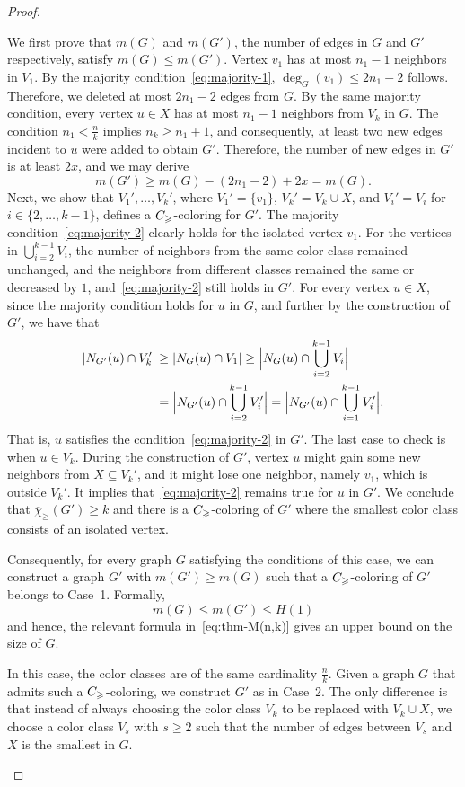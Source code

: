 \documentclass[10pt,a4paper]{amsart}
\newcommand{\cg}{{\rm C}_{\geqslant}}
\newcommand{\mc}{\overline{\chi}_{\geqslant}}
\begin{document}
\begin{proof}
\begin{description}
       We first prove that $m(G)$ and $m(G')$, the number of edges in $G$ and $G'$ respectively, satisfy $m(G) \leq m(G')$. Vertex $v_1 $ has at most $n_1-1$ neighbors in $V_1$. By the majority condition~\eqref{eq:majority-1}, $\deg_G(v_1) \leq 2n_1-2$ follows. Therefore, we deleted at most $2n_1-2$ edges from $G$. By the same majority condition, every vertex $u \in X$ has at most $n_1-1$ neighbors from $V_k$ in $G$. The condition $n_1 < \frac{n}{k}$ implies $n_k \ge n_1+1$, and consequently, at least two new edges incident to $u$ were added to obtain $G'$. Therefore, the number of new edges in $G'$ is at least $2x$, and we may derive 
       $$m(G') \ge m(G) -(2n_1-2) + 2x = m(G). 
       $$
       Next, we show that $V_1', \dots, V_k'$, where $V_1'=\{v_1\}$, $V_k'=V_k \cup X$, and $V_i'=V_i$ for $i\in \{2, \dots, k-1\}$, defines a $\cg$-coloring for $G'$. The majority condition~\eqref{eq:majority-2} clearly holds for the isolated vertex $v_1$. For the vertices in $\bigcup_{i=2}^{k-1} V_i$, the number of neighbors from the same color class remained unchanged, and the neighbors from different classes remained the same or decreased by $1$, and~\eqref{eq:majority-2} still holds in $G'$. For every vertex $u \in X$, since the majority condition holds for $u$ in $G$, and further by the construction of $G'$, we have that
       \begin{align*}
           |N_{G'}(u) \cap V_k'| &\ge |N_{G}(u) \cap V_1 | \ge \Bigl|N_{G}(u) \cap \bigcup_{i=2}^{k-1} V_i \Bigr|\\
           &= \Bigl|N_{G'}(u) \cap \bigcup_{i=2}^{k-1} V_i' \Bigr|
       = \Bigl|N_{G'}(u) \cap \bigcup_{i=1}^{k-1} V_i' \Bigr|.
       \end{align*}
       That is, $u$ satisfies the condition~\eqref{eq:majority-2} in $G'$. The last case to check is when $u \in V_k$. During the construction of $G'$, vertex $u$ might gain some new neighbors from $X \subseteq V_k'$, and it might lose one neighbor, namely $v_1$, which is outside $V_k'$. It implies that~\eqref{eq:majority-2} remains true for $u$ in $G'$. We conclude that $\mc(G') \ge k$ and there is a $\cg$-coloring of $G'$ where the smallest color class consists of an isolated vertex.

       Consequently, for every graph $G$ satisfying the conditions of this case, we can construct a graph $G'$ with $m(G') \ge m(G)$ such that a $\cg$-coloring of $G'$ belongs to Case~1. Formally,
       $$m(G) \leq m(G') \leq H(1)$$
       and hence, the relevant formula in~\eqref{eq:thm-M(n,k)} gives an upper bound on the size of $G$.
       \item[Case 3. $n_1=\frac{n}{k}$]
       In this case, the color classes are of the same cardinality $\frac{n}{k}$. Given a graph $G$ that admits such a $\cg$-coloring, we construct $G'$ as in Case~2. The only difference is that instead of always choosing the color class $V_k$ to be replaced with $V_k \cup X$, we choose a color class $V_s$ with $s \ge 2$ such that the number of edges between $V_s$ and $X$ is the smallest in $G$. 
       

\end{description}
\end{proof}
\end{document}
